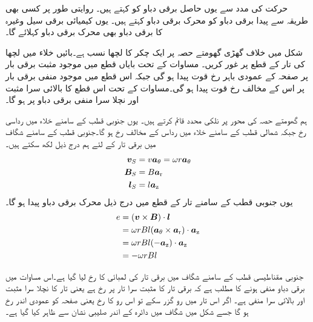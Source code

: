  حرکت کی مدد سے یوں حاصل برقی دباو کو   کہتے ہیں۔ روایتی طور پر کسی بھی طریقہ سے پیدا برقی دباو کو محرک برقی دباو کہتے ہیں۔ یوں کیمیائی برقی سیل وغیرہ کا برقی دباو بھی محرک برقی دباو کہلائے  گا۔

شکل  میں خلاف گھڑی گھومتے حصہ پر ایک چکر کا لچھا نسب ہے۔بائیں خلاء میں لچھا کی  تار کے قطع پر غور کریں۔ مساوات   کے تحت بایاں قطع میں موجود مثبت برقی بار پر صفحہ کے عمودی باہر رخ قوت پیدا ہو گی جبکہ اس قطع میں موجود منفی برقی بار پر اس کے مخالف رخ قوت پیدا ہو گی۔مساوات   کے تحت اس قطع کا بالائی  سرا مثبت   اور نچلا سرا منفی برقی دباو پر ہو گا۔

ہم گھومتے حصہ کی محور پر نلکی محدد قائم کرتے ہیں۔ یوں جنوبی قطب کے سامنے خلاء میں  رداسی رخ جبکہ شمالی  قطب کے سامنے  خلاء میں   رداس کے مخالف رخ ہو گا۔جنوبی قطب کے سامنے شگاف میں برقی تار   کے لئے ہم درج ذیل لکھ سکتے ہیں۔
\begin{gather}
\begin{aligned}
{\ensuremath{{\boldsymbol{v}}}}_S&=v {\boldsymbol{a}}_{\theta} =\omega r {\boldsymbol{a}}_{\theta}\\
{{\boldsymbol{B}}}_S&=B {\boldsymbol{a}}_{\textup{r}}\\
{{\boldsymbol{l}}}_S&=l {\boldsymbol{a}}_{\textup{z}}
\end{aligned}
\end{gather}
یوں  جنوبی قطب کے سامنے تار کے قطع  میں درج ذیل محرک برقی دباو پیدا ہو گا۔
\begin{gather}
\begin{aligned}
e&=({{\boldsymbol{v}}} \times {\ensuremath{{\boldsymbol{B}}}}) \cdot {\ensuremath{{\boldsymbol{l}}}}\\
&=\omega r B l  ({\boldsymbol{a}}_{\theta} \times {\boldsymbol{a}}_{\textup{r}}) \cdot {\boldsymbol{a}}_{\textup{z}}\\
&=\omega r B l  (-{\boldsymbol{a}}_{\textup{z}}) \cdot {\boldsymbol{a}}_{\textup{z}}\\
&=-\omega r B l 
\end{aligned}
\end{gather}

جنوبی مقناطیسی قطب کے سامنے شگاف میں برقی تار کی لمبائی کا رخ  لیا گیا ہے۔اس مساوات میں برقی دباو منفی ہونے کا مطلب ہے کہ برقی تار کا مثبت سرا تار پر  رخ ہے یعنی تار کا نچلا سرا مثبت اور بالائی سرا منفی ہے۔ اگر اس  تار میں  رو گزر سکے تو اس رو کا رخ   یعنی صفحہ کو عمودی اندر رخ ہو گا جسے  شکل  میں  شگاف میں دائرہ کے اندر صلیبی نشان سے ظاہر کیا گیا ہے۔ 

